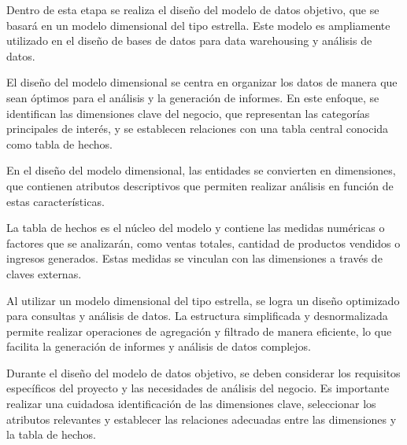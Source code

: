 Dentro de esta etapa se realiza el diseño del modelo de datos objetivo, que se basará en un modelo dimensional del tipo estrella. Este modelo es ampliamente utilizado en el diseño de bases de datos para data warehousing y análisis de datos.

El diseño del modelo dimensional se centra en organizar los datos de manera que sean óptimos para el análisis y la generación de informes. En este enfoque, se identifican las dimensiones clave del negocio, que representan las categorías principales de interés, y se establecen relaciones con una tabla central conocida como tabla de hechos.

En el diseño del modelo dimensional, las entidades se convierten en dimensiones, que contienen atributos descriptivos que permiten realizar análisis en función de estas características.

La tabla de hechos es el núcleo del modelo y contiene las medidas numéricas o factores que se analizarán, como ventas totales, cantidad de productos vendidos o ingresos generados. Estas medidas se vinculan con las dimensiones a través de claves externas.

Al utilizar un modelo dimensional del tipo estrella, se logra un diseño optimizado para consultas y análisis de datos. La estructura simplificada y desnormalizada permite realizar operaciones de agregación y filtrado de manera eficiente, lo que facilita la generación de informes y análisis de datos complejos.

Durante el diseño del modelo de datos objetivo, se deben considerar los requisitos específicos del proyecto y las necesidades de análisis del negocio. Es importante realizar una cuidadosa identificación de las dimensiones clave, seleccionar los atributos relevantes y establecer las relaciones adecuadas entre las dimensiones y la tabla de hechos.

